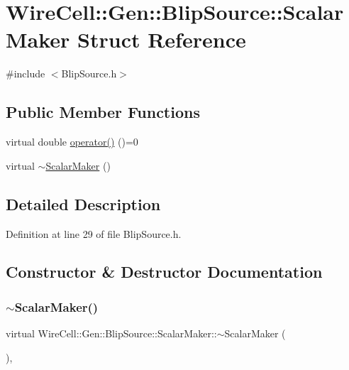 \hypertarget{struct_wire_cell_1_1_gen_1_1_blip_source_1_1_scalar_maker}{}\section{Wire\+Cell\+:\+:Gen\+:\+:Blip\+Source\+:\+:Scalar\+Maker Struct Reference}
\label{struct_wire_cell_1_1_gen_1_1_blip_source_1_1_scalar_maker}


{\ttfamily \#include $<$Blip\+Source.\+h$>$}

\subsection*{Public Member Functions}
\begin{DoxyCompactItemize}
\item 
virtual double \hyperlink{struct_wire_cell_1_1_gen_1_1_blip_source_1_1_scalar_maker_a890bdec9160e2786391285b7f98a5453}{operator()} ()=0
\item 
virtual \hyperlink{struct_wire_cell_1_1_gen_1_1_blip_source_1_1_scalar_maker_a5d3bd7b4eec9f5fc475f7ea81f7e7093}{$\sim$\+Scalar\+Maker} ()
\end{DoxyCompactItemize}


\subsection{Detailed Description}


Definition at line 29 of file Blip\+Source.\+h.



\subsection{Constructor \& Destructor Documentation}
\mbox{\label{struct_wire_cell_1_1_gen_1_1_blip_source_1_1_scalar_maker_a5d3bd7b4eec9f5fc475f7ea81f7e7093}} 
\subsubsection{\texorpdfstring{$\sim$\+Scalar\+Maker()}{~ScalarMaker()}}
{\footnotesize\ttfamily virtual Wire\+Cell\+::\+Gen\+::\+Blip\+Source\+::\+Scalar\+Maker\+::$\sim$\+Scalar\+Maker (\begin{DoxyParamCaption}{ }\end{DoxyParamCaption})\hspace{0.3cm}{\ttfamily [inline]}, {\ttfamily [virtual]}}



